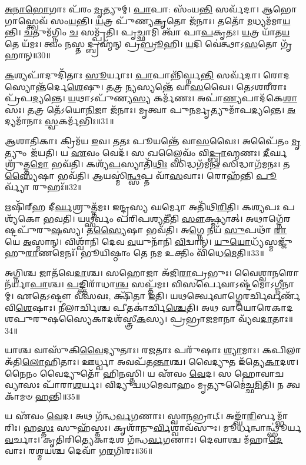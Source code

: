 \-\ul{𑌅}\-\-\ul{𑌨𑌾}\-\-\ul{𑌭𑍋}\-𑌗𑌾𑌃 𑌪᳴𑌰𑌂 \ul{𑌮𑍃}\-𑌤𑍍𑌯𑍁𑌮𑍍। \ul{𑌪𑌾}\-𑌪𑌾: 𑌸𑌂᳴𑌯\-\ul{𑌨𑍍𑌤𑌿} 𑌸𑌰𑍍𑌵᳴𑌦𑌾। 
𑌆𑌭𑍋𑌗𑌾𑌸𑍍𑌤𑍍𑌵𑍇𑌵᳴ 𑌸𑌂\-\ul{𑌯}\-𑌨𑍍𑌤𑌿। \ul{𑌯}\-𑌤𑍍𑌰 𑌪𑍁᳴𑌣𑍍𑌯\-\ul{𑌕𑍃}\-𑌤𑍋 𑌜᳴𑌨𑌾𑌃। 
𑌤𑌤𑍋᳴ \ul{𑌮}\-𑌧𑍍𑌯𑌮᳴𑌮𑌾\-\ul{𑌯}\-𑌨𑍍𑌤𑌿। \ul{𑌚}\-𑌤𑍁𑌮᳴𑌗𑍍𑌨𑌿𑌂 \ul{𑌚} 𑌸𑌮𑍍𑌪𑍍𑌰᳴𑌤𑌿। 
𑌪𑍃𑌚𑍍𑌛𑌾𑌮𑌿 𑌤𑍍𑌵𑌾᳴ 𑌪𑌾\-\ul{𑌪}\-𑌕𑍃𑌤𑌃। \ul{𑌯}\-𑌤𑍍𑌰 𑌯𑌾᳴𑌤\-\ul{𑌯}\-𑌤𑍇 𑌯᳴𑌮𑌃। 
𑌤𑍍𑌵𑌂 𑌨𑌸𑍍𑌤𑌦𑍍𑌬𑍍𑌰𑌹𑍍𑌮᳴𑌨𑍍‌ 𑌪𑍍𑌰\-\ul{𑌬𑍍𑌰𑍂}\-𑌹𑌿। \ul{𑌯}\-𑌦𑌿 𑌵𑍇॑𑌤𑍍𑌥𑌾𑌽\-\ul{𑌸}\-𑌤𑍋 𑌗𑍃᳴𑌹𑌾𑌨𑍍॥30॥

\-\ul{𑌕}\-𑌶𑍍𑌯𑌪𑌾᳴𑌦𑍁𑌦𑌿᳴𑌤𑌾𑌃 \ul{𑌸𑍂}\-𑌰𑍍𑌯𑌾𑌃। \ul{𑌪𑌾}\-𑌪𑌾𑌨𑍍𑌨𑌿᳴𑌰𑍍𑌘𑍍𑌨\-\ul{𑌨𑍍𑌤𑌿} 𑌸𑌰𑍍𑌵᳴𑌦𑌾। 
𑌰𑍋𑌦𑌸𑍍𑌯𑍋𑌨𑍍𑌤᳴𑌰𑍍𑌦𑍇\-\-\ul{𑌶𑍇}\-𑌷𑍁। 𑌤𑌤𑍍𑌰 𑌨𑍍𑌯𑌸𑍍𑌯𑌨𑍍𑌤𑍇᳴ 𑌵𑌾\-\ul{𑌸}\-𑌵𑍈𑌃। 
𑌤𑍇𑌽𑌶𑌰𑍀𑌰𑌾𑌃 𑌪𑍍𑌰᳴𑌪\-\ul{𑌦𑍍𑌯}\-𑌨𑍍𑌤𑍇। \ul{𑌯}\-𑌥𑌾\-𑌽𑌪𑍁᳴𑌣𑍍𑌯\-\ul{𑌸𑍍𑌯} 𑌕𑌰𑍍𑌮᳴𑌣𑌃। 
𑌅𑌪𑌾॑\-\ul{𑌣𑍍𑌯}\-𑌪𑌾𑌦᳴𑌕𑍇\-\ul{𑌶𑌾}\-𑌸𑌃। \ul{𑌤}\-𑌤𑍍𑌰 𑌤𑍇᳴𑌽𑌯𑍋\-\ul{𑌨𑌿}\-𑌜𑌾 𑌜᳴𑌨𑌾𑌃। 
𑌮𑍃𑌤𑍍𑌵𑌾 𑌪𑍁𑌨𑌰𑍍𑌮𑍃𑌤𑍍𑌯𑍁𑌮𑌾᳴𑌪\-\ul{𑌦𑍍𑌯}\-𑌨𑍍𑌤𑍇। \ul{𑌅}\-𑌦𑍍𑌯𑌮𑌾᳴𑌨𑌾𑌃 \ul{𑌸𑍍𑌵}\-𑌕𑌰𑍍𑌮᳴𑌭𑌿𑌃॥31॥

𑌆𑌶𑌾𑌤𑌿𑌕𑌾𑌃 𑌕𑍍𑌰𑌿𑌮᳴𑌯 \ul{𑌇}\-𑌵। 𑌤𑌤𑌃 𑌪𑍂𑌯𑌨𑍍𑌤𑍇᳴ 𑌵𑌾\-\ul{𑌸}\-𑌵𑍈𑌃। 𑌅𑌪𑍈᳴𑌤𑌂 \ul{𑌮𑍃}\-𑌤𑍍𑌯𑍁𑌂 𑌜᳴𑌯𑌤𑌿। 
𑌯 \ul{𑌏}\-𑌵𑌂 𑌵𑍇𑌦᳴। 𑌸 𑌖𑌲𑍍𑌵𑍈𑌵𑌂᳴ 𑌵𑌿\-\ul{𑌦𑍍𑌬𑍍𑌰𑌾}\-𑌹𑍍𑌮𑌣𑌃। \ul{𑌦𑍀}\-𑌰𑍍𑌘𑌶𑍍𑌰𑍁᳴𑌤𑍍𑌤\-\ul{𑌮𑍋} 𑌭𑌵᳴𑌤𑌿। 
𑌕𑌶𑍍𑌯᳴\-\ul{𑌪}\-𑌸𑍍𑌯𑌾𑌤𑌿᳴\-\ul{𑌥𑌿𑌃} 𑌸𑌿𑌦𑍍𑌧𑌗᳴𑌮\-\ul{𑌨𑌃} 𑌸𑌿𑌦𑍍𑌧𑌾𑌗᳴𑌮𑌨𑌃। 𑌤\-\ul{𑌸𑍍𑌯𑍈}\-𑌷𑌾 𑌭𑌵᳴𑌤𑌿। 
𑌆𑌯𑌸𑍍𑌮𑌿॑\-\ul{𑌨𑍍𑌥𑍍𑌸}\-𑌪𑍍𑌤 𑌵𑌾᳴\-\ul{𑌸}\-𑌵𑌾𑌃। 𑌰𑍋𑌹᳴𑌨𑍍𑌤𑌿 \ul{𑌪𑍂}\-𑌰𑍍𑌵𑍍𑌯𑌾᳴ 𑌰𑍁𑌹𑌃᳴॥32॥

𑌋𑌷𑌿᳴𑌰𑍍‌𑌹 𑌦𑍀\-\ul{𑌰𑍍𑌘}\-𑌶𑍍𑌰𑍁𑌤𑍍𑌤᳴𑌮𑌃। 𑌇𑌨𑍍𑌦𑍍𑌰𑌸𑍍𑌯 𑌘𑌰𑍍𑌮𑍋 𑌅𑌤𑌿᳴𑌥𑌿\-\ul{𑌰𑌿}\-𑌤𑌿। 
𑌕𑌶𑍍𑌯𑌪𑌃 𑌪𑌶𑍍𑌯᳴𑌕𑍋 \ul{𑌭}\-𑌵𑌤𑌿। 𑌯𑌥𑍍𑌸𑌰𑍍𑌵𑌂 𑌪𑌰𑌿𑌪𑌶𑍍𑌯𑌤𑍀᳴𑌤𑌿 \ul{𑌸𑍗}\-𑌕𑍍𑌷𑍍𑌮𑍍𑌯𑌾𑌤𑍍। 
𑌅𑌥𑌾𑌗𑍍𑌨𑍇᳴𑌰𑌷𑍍𑌟𑌪𑍁᳴𑌰𑍁\-\ul{𑌷}\-𑌸𑍍𑌯। 𑌤\-\ul{𑌸𑍍𑌯𑍈}\-𑌷𑌾 𑌭𑌵᳴𑌤𑌿। 
𑌅\-\ul{𑌗𑍍𑌨𑍇} 𑌨𑌯᳴ \ul{𑌸𑍁}\-𑌪𑌥𑌾᳴ \ul{𑌰𑌾}\-𑌯𑍇 \ul{𑌅}\-𑌸𑍍𑌮𑌾𑌨𑍍। 𑌵𑌿𑌶𑍍𑌵𑌾᳴𑌨𑌿 𑌦𑍇𑌵 \ul{𑌵}\-𑌯𑍁𑌨𑌾᳴𑌨𑌿 \ul{𑌵𑌿}\-𑌦𑍍𑌵𑌾𑌨𑍍। 
\-\ul{𑌯𑍁}\-\-\ul{𑌯𑍋}\-𑌧𑍍𑌯᳴𑌸𑍍𑌮𑌜𑍍𑌜𑍁᳴𑌹𑍁\-\ul{𑌰𑌾}\-𑌣𑌮𑍇𑌨𑌃᳴। 𑌭𑍂𑌯𑌿𑌷𑍍𑌠𑌾𑌂 𑌤𑍇 𑌨𑌮 𑌉𑌕𑍍𑌤𑌿𑌂 𑌵𑌿᳴𑌧𑍇\-\ul{𑌮𑍇}\-𑌤𑌿॥33॥\anuvakamend


𑌅𑌗𑍍𑌨𑌿𑌶𑍍𑌚 𑌜𑌾𑌤᳴𑌵𑍇\-\ul{𑌦𑌾}\-𑌶𑍍𑌚। 𑌸𑌹𑍋𑌜𑌾 𑌅᳴𑌜𑌿\-\ul{𑌰𑌾}\-𑌪𑍍𑌰𑌭𑍁𑌃। 𑌵𑍈𑌶𑍍𑌵𑌾𑌨𑌰𑍋 𑌨᳴𑌰𑍍𑌯𑌾\-\ul{𑌪𑌾}\-𑌶𑍍𑌚। 
\-\ul{𑌪}\-𑌙𑍍𑌕𑍍𑌤𑌿𑌰𑌾᳴𑌧𑌾\-\ul{𑌶𑍍𑌚} 𑌸𑌪𑍍𑌤᳴𑌮𑌃। 𑌵𑌿𑌸𑌰𑍍𑌪𑍇𑌵𑌾𑌽𑌷𑍍𑌟᳴𑌮𑍋𑌽\-\ul{𑌗𑍍𑌨𑍀}\-𑌨𑌾𑌮𑍍। 
𑌏𑌤𑍇𑌽𑌷𑍍𑌟𑍗 𑌵𑌸𑌵𑌃, 𑌕𑍍𑌷𑌿᳴𑌤𑌾 \ul{𑌇}\-𑌤𑌿। 𑌯𑌥𑌰𑍍𑌤𑍍𑌵𑍇𑌵𑌾𑌗𑍍𑌨𑍇𑌰𑌰𑍍𑌚𑌿𑌰𑍍𑌵𑌰𑍍𑌣᳴𑌵𑌿\-\ul{𑌶𑍇}\-𑌷𑌾𑌃। 
𑌨𑍀𑌲𑌾𑌰𑍍𑌚𑌿𑌶𑍍𑌚 𑌪𑍀𑌤𑌕𑌾॑𑌰𑍍𑌚𑌿\-\ul{𑌶𑍍𑌚𑍇}\-𑌤𑌿। 𑌅𑌥 𑌵𑌾𑌯𑍋𑌰𑍇𑌕𑌾𑌦𑌶𑌪𑍁𑌰𑍁𑌷𑌸𑍍𑌯𑍈𑌕𑌾\-𑌦𑌶᳴𑌸𑍍𑌤𑍍𑌰𑍀\-\ul{𑌕}\-𑌸𑍍𑌯। 
𑌪𑍍𑌰𑌭𑍍𑌰𑌾𑌜𑌮𑌾𑌨𑌾 𑌵𑍍𑌯᳴𑌵\-\ul{𑌦𑌾}\-𑌤𑌾𑌃॥34॥


𑌯𑌾𑌶𑍍𑌚 𑌵𑌾𑌸𑍁᳴𑌕𑌿\-\ul{𑌵𑍈}\-𑌦𑍍𑌯𑍁𑌤𑌾𑌃। 𑌰𑌜𑌤𑌾𑌃 𑌪𑌰𑍁᳴𑌷𑌾𑌃 \ul{𑌶𑍍𑌯𑌾}\-𑌮𑌾𑌃। 𑌕𑌪𑌿𑌲𑌾 𑌅᳴𑌤𑌿\-\ul{𑌲𑍋}\-𑌹𑌿𑌤𑌾𑌃। 
𑌊𑌰𑍍𑌧𑍍𑌵𑌾 𑌅𑌵𑌪᳴𑌤\-\ul{𑌨𑍍𑌤𑌾}\-𑌶𑍍𑌚। 𑌵𑍈𑌦𑍍𑌯𑍁𑌤 𑌇᳴𑌤𑍍𑌯𑍇\-\ul{𑌕𑌾}\-𑌦𑌶। 𑌨𑍈𑌨𑌂 𑌵𑍈𑌦𑍍𑌯𑍁𑌤𑍋᳴ 𑌹𑌿\-\ul{𑌨}\-𑌸𑍍𑌤𑌿। 
𑌯 𑌏᳴𑌵𑌂 \ul{𑌵𑍇}\-𑌦। 𑌸 𑌹𑍋𑌵𑌾𑌚 𑌵𑍍𑌯𑌾𑌸𑌃 𑌪𑌾᳴𑌰𑌾\-\ul{𑌶}\-𑌰𑍍𑌯𑌃। 
𑌵𑌿𑌦𑍍𑌯𑍁𑌦𑍍𑌵𑌧𑌮𑍇𑌵𑌾𑌹𑌂 𑌮𑍃𑌤𑍍𑌯𑍁𑌮𑍈॑𑌚𑍍𑌛\-\ul{𑌮𑌿}\-𑌤𑌿। 𑌨 𑌤𑍍𑌵𑌕𑌾᳴𑌮𑍞 \ul{𑌹}\-𑌨𑍍𑌤𑌿॥35॥


𑌯 𑌏᳴𑌵𑌂 \ul{𑌵𑍇}\-𑌦। 𑌅𑌥 𑌗᳴𑌨𑍍𑌧\-\ul{𑌰𑍍𑌵}\-𑌗𑌣𑌾𑌃। 𑌸𑍍𑌵𑌾\-\ul{𑌨}\-𑌭𑍍𑌰𑌾𑌟𑍍। 
𑌅𑌙𑍍𑌘𑌾᳴\-\ul{𑌰𑌿}\-𑌰𑍍𑌬𑌮𑍍𑌭𑌾᳴𑌰𑌿𑌃। 𑌹\-\ul{𑌸𑍍𑌤𑌃} 𑌸𑍁𑌹᳴𑌸𑍍𑌤𑌃। 𑌕𑍃𑌶𑌾᳴𑌨𑍁\-\ul{𑌰𑍍𑌵𑌿}\-𑌶𑍍𑌵𑌾𑌵᳴𑌸𑍁𑌃। 
𑌮𑍂𑌰𑍍𑌧𑌨𑍍𑌵𑌾𑌨𑍍𑌥𑍍𑌸𑍂॑𑌰𑍍𑌯\-\ul{𑌵}\-𑌰𑍍𑌚𑌾𑌃। 𑌕𑍃𑌤𑌿𑌰𑌿𑌤𑍍𑌯𑍇𑌕𑌾𑌦𑌶 𑌗᳴𑌨𑍍𑌧\-\ul{𑌰𑍍𑌵}\-𑌗𑌣𑌾𑌃। 
𑌦𑍇𑌵𑌾𑌶𑍍𑌚 𑌮᳴𑌹𑌾\-\ul{𑌦𑍇}\-𑌵𑌾𑌃। 𑌰𑌶𑍍𑌮𑌯𑌶𑍍𑌚 𑌦𑍇𑌵𑌾᳴ 𑌗\-\ul{𑌰}\-𑌗𑌿𑌰𑌃॥36॥


